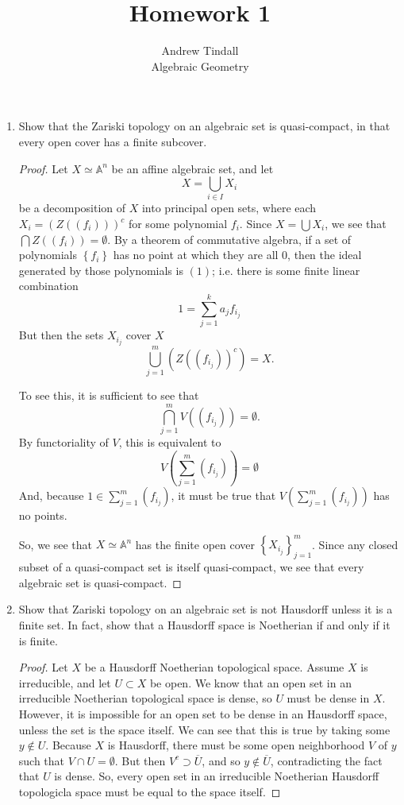 \documentclass[12pt]{article}
\theoremstyle{definition}
\newenvironment{problem}[2][Problem]{\begin{trivlist}
\item[\hskip \labelsep {\bfseries #1}\hskip \labelsep {\bfseries #2.}]}{\end{trivlist}}
\begin{document}
 
 
\title{Homework 1}
\author{Andrew Tindall\\
Algebraic Geometry}
 
\maketitle
\begin{problem}{1}
\begin{enumerate}[label=(\alph*)]
    \item Show that the Zariski topology on an algebraic set is quasi-compact, in that every open cover has a finite subcover.
    \begin{proof}
	    Let $X \simeq \mathbb A^n$ be an affine algebraic set, and let 
	    \[ X = \bigcup_{i \in I} X_i\]
	    be a decomposition of $X$ into principal open sets, where each $X_i = (Z( (f_i)))^c$ for some polynomial $f_i$. Since $X = \bigcup X_i$, we see that $\bigcap Z( (f_i)) = \emptyset$. By a theorem of commutative algebra, if a set of polynomials $\left\{ f_i \right\}$ has no point at which they are all $0$, then the ideal generated by those polynomials is $(1)$; i.e. there is some finite linear combination 
	    \[1 = \sum_{j = 1}^k a_jf_{i_j}\]
	    But then the sets $X_{i_j}$ cover $X$
	    \[ \bigcup_{j=1}^{m} (Z( (f_{i_j}))^c) = X.\]
	    \par To see this, it is sufficient to see that 
	    \[\bigcap_{j=1}^m V( (f_{i_j})) = \emptyset.\]
	    By functoriality of $V$, this is equivalent to 
	    \[V\left( \sum_{j=1}^m (f_{i_j}) \right) = \emptyset\]
	    And, because $1 \in \sum_{j=1}^m (f_{i_j})$, it must be true that $V\left( \sum_{j=1}^m (f_{i_j})\right) $ has no points. 
	    \par So, we see that $X \simeq \mathbb A^n$ has the finite open cover $\left\{ X_{i_j} \right\}_{j=1	}^m$. Since any closed subset of a quasi-compact set is itself quasi-compact, we see that every algebraic set is quasi-compact.
    \end{proof}
    \item Show that Zariski topology on an algebraic set is not Hausdorff unless it is a finite set. In fact, show that a Hausdorff space is Noetherian if and only if it is finite.
    \begin{proof}
	    \par Let $X$ be a Hausdorff Noetherian topological space. Assume $X$ is irreducible, and let $U \subset X$ be open. We know that an open set in an irreducible Noetherian topological space is dense, so $U$ must be dense in $X$. However, it is impossible for an open set to be dense in an Hausdorff space, unless the set is the space itself. We can see that this is true by taking some $y \notin U$. Because $X$ is Hausdorff, there must be some open neighborhood $V$ of $y$ such that $V \cap U = \emptyset$. But then $V^c \supset \overline U$, and so $y \notin \overline U$, contradicting the fact that $U$ is dense. So, every open set in an irreducible Noetherian Hausdorff topologicla space must be equal to the space itself.

\end{proof}
\end{enumerate}
\end{problem}
\end{document}

